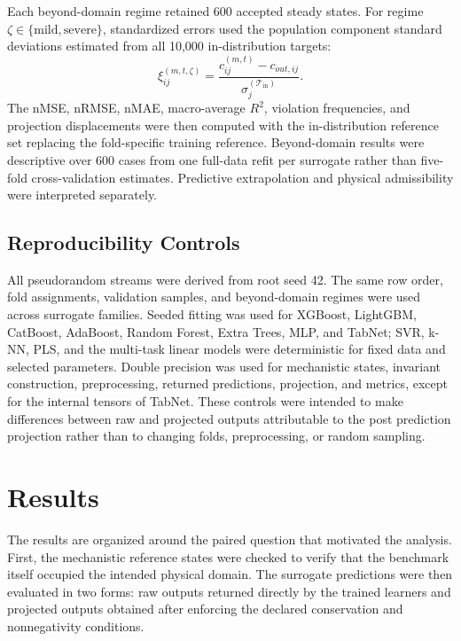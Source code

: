 \documentclass[12pt, twoside]{book}
\begin{document}
Each beyond-domain regime retained 600 accepted steady states. For regime
\(\zeta\in\{\mathrm{mild},\mathrm{severe}\}\), standardized errors used the population component standard
deviations estimated from all 10,000 in-distribution targets:
\begin{equation}
\label{eq:ch2_beyond_domain_residual}
\xi_{ij}^{(m,t,\zeta)}
=\frac{c_{ij}^{(m,t)}-c_{out,ij}}
{\sigma_j^{(\mathcal{T}_{\mathrm{in}})}}.
\end{equation}
The nMSE, nRMSE, nMAE, macro-average \(R^2\), violation frequencies, and projection displacements were then
computed with the in-distribution reference set replacing the fold-specific training reference. Beyond-domain
results were descriptive over 600 cases from one full-data refit per surrogate rather than five-fold
cross-validation estimates. Predictive extrapolation and physical admissibility were interpreted separately.

\subsection{Reproducibility Controls}

All pseudorandom streams were derived from root seed 42. The same row order, fold assignments, validation
samples, and beyond-domain regimes were used across surrogate families. Seeded fitting was used for XGBoost,
LightGBM, CatBoost, AdaBoost, Random Forest, Extra Trees, MLP, and TabNet; SVR, k-NN, PLS, and the multi-task
linear models were deterministic for fixed data and selected parameters. Double precision was used for
mechanistic states, invariant construction, preprocessing, returned predictions, projection, and metrics,
except for the internal tensors of TabNet. These controls were intended to make differences between raw and
projected outputs attributable to the post prediction projection rather than to changing folds, preprocessing,
or random sampling.

\section{Results}

The results are organized around the paired question that motivated the analysis. First, the mechanistic
reference states were checked to verify that the benchmark itself occupied the intended physical domain. The
surrogate predictions were then evaluated in two forms: raw outputs returned directly by the trained learners
and projected outputs obtained after enforcing the declared conservation and nonnegativity conditions.
\end{document}
